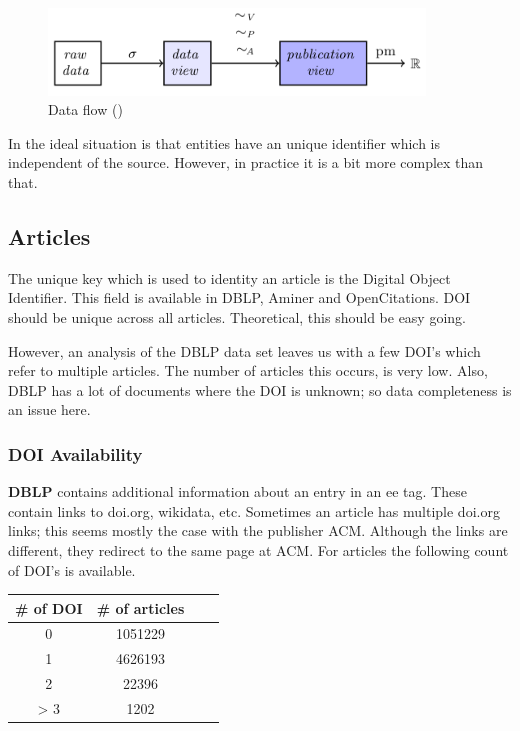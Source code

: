 \documentclass{ou-report}
\newcommand{\todo}[1]{{\color{red} TODO: #1}}
\begin{document}
\begin{figure}[H]
    \centering
    \includegraphics[width=10cm]{images/data_to_publication_metrics_jm2017.png}
    \caption{Data flow (\cite{JM2017})}
    \label{fig:dataflow_jm2017_2}
\end{figure}

In the ideal situation is that entities have an unique identifier which is 
independent of the source. However, in practice it is a bit more complex than 
that.

\subsection{Articles}
The unique key which is used to identity an article is the Digital Object 
Identifier. This field is available in DBLP, Aminer and OpenCitations. DOI 
should be unique across all articles. Theoretical, this should be easy going.

However, an analysis of the DBLP data set leaves us with a few DOI's which refer
to multiple articles. The number of articles this occurs, is very low. Also, DBLP 
has a lot of documents where the DOI is unknown; so data completeness 
is an issue here. 

\subsubsection{DOI Availability}
\textbf{DBLP} contains additional information about an entry in an ee tag. These contain 
links to doi.org, wikidata, etc. Sometimes an article has multiple doi.org links; 
this seems mostly the case with the publisher ACM. Although the links are 
different, they redirect to the same page at ACM.
For articles the following count of DOI's is available.
\begin{center}
    \begin{tabular}{ |c|c|c|c| }
        \hline
        \# of DOI & \# of articles \\
        \hline
        0 & 1051229 \\
        1 & 4626193 \\
        2 & 22396 \\
        > 3 & 1202 \\
        \hline
    \end{tabular}
\end{center}
\end{document}
